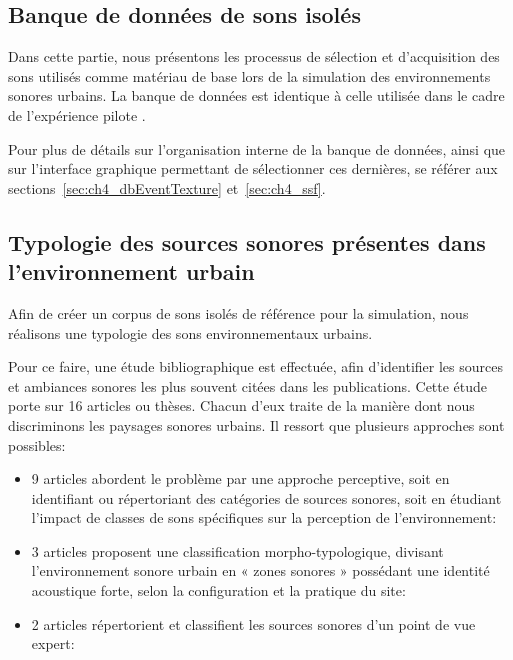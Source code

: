\subsection{Banque de données de sons isolés}

Dans cette partie, nous présentons les processus de sélection et d'acquisition des sons utilisés comme matériau de base lors de la simulation des environnements sonores urbains. La banque de données est identique à celle utilisée dans le cadre de l'expérience pilote \citep{lafay2013atiam,lafay2014new}. 

Pour plus de détails sur l'organisation interne de la banque de données, ainsi que sur l'interface graphique permettant de sélectionner ces dernières, se référer aux sections~\ref{sec:ch4_dbEventTexture} et~\ref{sec:ch4_ssf}.

\subsection[Typologie des sources sonores]{Typologie des sources sonores présentes dans l'environnement urbain}

Afin de créer un corpus de sons isolés de référence pour la simulation, nous réalisons une typologie des sons environnementaux urbains. 

Pour ce faire, une étude bibliographique est effectuée, afin d'identifier les sources et ambiances sonores les plus souvent citées dans les publications. Cette étude porte sur 16 articles ou thèses. Chacun d'eux traite de la manière dont nous discriminons les paysages sonores urbains. Il ressort que plusieurs approches sont possibles:

\begin{itemize}
\item 9 articles abordent le problème par une approche perceptive, soit en identifiant ou répertoriant des catégories de sources sonores, soit en étudiant l'impact de classes de sons spécifiques sur la perception de l'environnement: \cite{maffiolo_caracterisation_1999,raimbault2002simulation,guastavino_etude_2003,defreville2004aactivity,raimbault2005urban,dubois2006cognitive,devergie_relations_2006,guastavino2006ideal,niessen2010categories}
\item 3 articles proposent une classification morpho-typologique, divisant l’environnement sonore urbain en « zones sonores » possédant une identité acoustique forte, selon la configuration et la pratique du site: \cite{maffiolo_caracterisation_1999,beaumont2004pertinence,polack2008perceptive}
\item 2 articles répertorient et classifient les sources sonores d’un point de vue expert: \cite{leobon_analyse_1986,brown2011towards}
\end{itemize}

